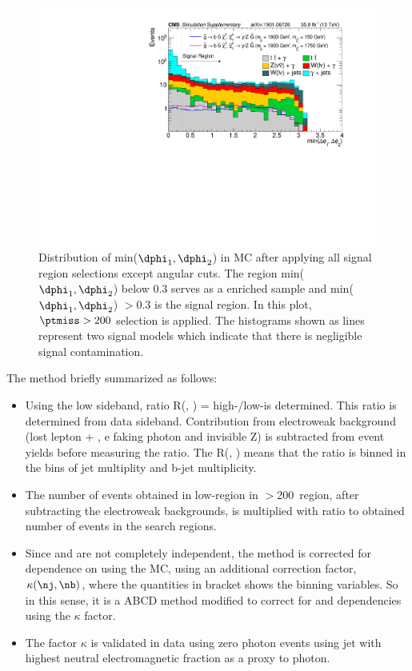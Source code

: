 \begin{figure}[h!]
\centering
\includegraphics[width=0.8\linewidth]{../Figures/Chap3/anaPublic/supp_Sim_mindPhi1dPhi2_T5bbbbZG}
\captionsetup{width=.9\linewidth}
\caption[Min($\dphi_{1},\dphi_{2}$) in MC]{Distribution of min($\dphi_{1},\dphi_{2}$) in MC after applying all signal region selections except angular cuts. The region min($\dphi_{1},\dphi_{2}$) below 0.3 serves as a \gjets enriched sample and min($\dphi_{1},\dphi_{2}$) $>0.3$ is the signal region. In this plot, $\ptmiss > 200$ \gev selection is applied. The histograms shown as lines represent two signal models which indicate that there is negligible signal contamination.}
\label{fig:supp_Sim_mindPhi1dPhi2_T5bbbbZG}
\end{figure}

The method briefly summarized as follows: 
\begin{itemize}
 \item Using the low \ptmiss sideband, ratio R(\nj, \nb) = high-\dphi/low-\dphi is determined. This ratio is determined from data sideband. Contribution from electroweak background (lost lepton + \tauh, e faking photon and invisible Z) is subtracted from event yields before measuring the ratio. The R(\nj, \nb) means that the ratio is binned in the bins of jet multiplity and b-jet multiplicity.
 \item The number of events obtained in low-\dphi region in \ptmiss$>$200~\gev region, after subtracting the electroweak backgrounds, is multiplied with ratio to obtained number of events in the search regions. 
 \item Since \dphi and \ptmiss are not completely independent, the method is corrected for dependence on \ptmiss using the MC, using an additional correction factor, $\kappa(\nj, \nb)$, where the quantities in bracket shows the binning variables. So in this sense, it is a ABCD method modified to correct for \dphi and \ptmiss dependencies using the $\kappa$ factor.
 \item The factor $\kappa$ is validated in data using zero photon events using jet with highest neutral electromagnetic fraction as a proxy to photon.
\end{itemize}

